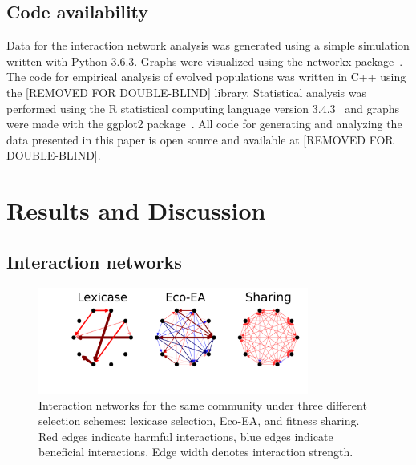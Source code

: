 \subsection{Code availability}
Data for the interaction network analysis was generated using a simple simulation written with Python 3.6.3. Graphs were visualized using the networkx package~\cite{hagberg_exploring_2008}. The code for empirical analysis of evolved populations was written in C++ using the [REMOVED FOR DOUBLE-BLIND] library. Statistical analysis was performed using the R statistical computing language version 3.4.3~\cite{r_core_team_r:_2017} and graphs were made with the ggplot2 package~\cite{wickham_ggplot2:_2009}. All code for generating and analyzing the data presented in this paper is open source and available at [REMOVED FOR DOUBLE-BLIND]. 

\section{Results and Discussion}

\subsection{Interaction networks}

\begin{figure}
\includegraphics[width=3.5in]{figs/interaction_networks.png}
\caption{Interaction networks for the same community under three different selection schemes: lexicase selection, Eco-EA, and fitness sharing. Red edges indicate harmful interactions, blue edges indicate beneficial interactions. Edge width denotes interaction strength.}
\label{interaction_network}
\end{figure}

